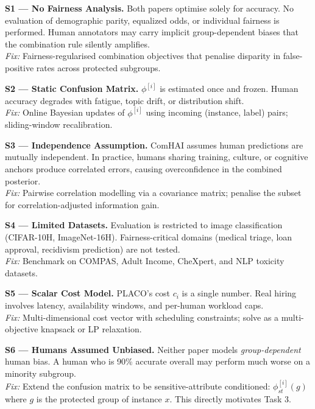 \documentclass[10pt,twocolumn]{article}
\begin{document}
\begin{tcolorbox}[novelbox, title={$\star$\; Shortcomings \& Proposed
  Improvements (5 marks)}]

\textbf{S1 --- No Fairness Analysis.}
Both papers optimise solely for accuracy. No evaluation of
demographic parity, equalized odds, or individual fairness is
performed. Human annotators may carry implicit group-dependent biases
that the combination rule silently amplifies.\\[2pt]
\textit{Fix:} Fairness-regularised combination objectives that penalise
disparity in false-positive rates across protected subgroups.

\smallskip
\textbf{S2 --- Static Confusion Matrix.}
$\phi^{[i]}$ is estimated once and frozen. Human accuracy degrades with
fatigue, topic drift, or distribution shift.\\[2pt]
\textit{Fix:} Online Bayesian updates of $\phi^{[i]}$ using incoming
(instance, label) pairs; sliding-window recalibration.

\smallskip
\textbf{S3 --- Independence Assumption.}
ComHAI assumes human predictions are mutually independent. In practice,
humans sharing training, culture, or cognitive anchors produce
correlated errors, causing overconfidence in the combined posterior.\\[2pt]
\textit{Fix:} Pairwise correlation modelling via a covariance matrix;
penalise the subset for correlation-adjusted information gain.

\smallskip
\textbf{S4 --- Limited Datasets.}
Evaluation is restricted to image classification (CIFAR-10H,
ImageNet-16H). Fairness-critical domains (medical triage, loan approval,
recidivism prediction) are not tested.\\[2pt]
\textit{Fix:} Benchmark on COMPAS, Adult Income, CheXpert, and NLP
toxicity datasets.

\smallskip
\textbf{S5 --- Scalar Cost Model.}
PLACO's cost $c_i$ is a single number. Real hiring involves latency,
availability windows, and per-human workload caps.\\[2pt]
\textit{Fix:} Multi-dimensional cost vector with scheduling constraints;
solve as a multi-objective knapsack or LP relaxation.

\smallskip
\textbf{S6 --- Humans Assumed Unbiased.}
Neither paper models \emph{group-dependent} human bias. A human who is
90\% accurate overall may perform much worse on a minority subgroup.\\[2pt]
\textit{Fix:} Extend the confusion matrix to be sensitive-attribute
conditioned: $\phi^{[i]}_{st}(g)$ where $g$ is the protected group of
instance $x$. This directly motivates Task 3.

\end{tcolorbox}
\end{document}
